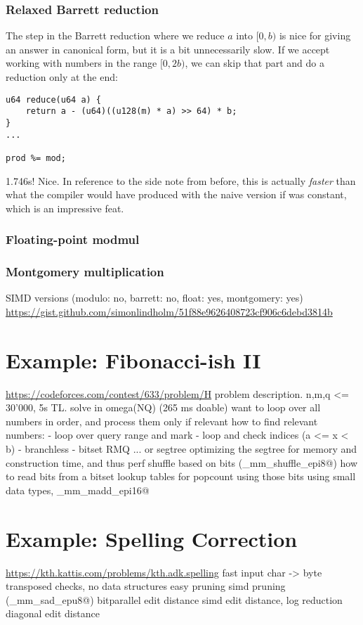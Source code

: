 \documentclass[openany]{book}
\begin{document}
\subsection*{Relaxed Barrett reduction}
The step in the Barrett reduction where we reduce $a$ into $[0, b)$ is nice for giving an answer in canonical form, but it is a bit unnecessarily slow. If we accept working with numbers in the range $[0, 2b)$, we can skip that part and do a reduction only at the end:
\begin{lstlisting}
u64 reduce(u64 a) {
	return a - (u64)((u128(m) * a) >> 64) * b;
}
...

prod %= mod;
\end{lstlisting}
1.746s! Nice. In reference to the side note from before, this is actually \emph{faster} than what the compiler would have produced with the naive version if \verb@mod@ was constant, which is an impressive feat.

\subsection*{Floating-point modmul}


\subsection*{Montgomery multiplication}

SIMD versions (modulo: no, barrett: no, float: yes, montgomery: yes)
\url{https://gist.github.com/simonlindholm/51f88e9626408723cf906c6debd3814b}

\chapter{Example: Fibonacci-ish II}
\url{https://codeforces.com/contest/633/problem/H}
problem description. n,m,q <= 30'000, 5s TL. solve in omega(NQ) (265 ms doable)
want to loop over all numbers in order, and process them only if relevant
how to find relevant numbers:
- loop over query range and mark
- loop and check indices (a <= x < b)
- branchless
- bitset RMQ ... or segtree
optimizing the segtree for memory and construction time, and thus perf
shuffle based on bits (\verb@_mm_shuffle_epi8@)
how to read bits from a bitset
lookup tables for popcount using those bits
using small data types, \verb@_mm_madd_epi16@

\chapter{Example: Spelling Correction}
\url{https://kth.kattis.com/problems/kth.adk.spelling}
fast input
char -> byte
transposed checks, no data structures
easy pruning
simd pruning (\verb@_mm_sad_epu8@)
bitparallel edit distance
simd edit distance, log reduction
diagonal edit distance
\end{document}
